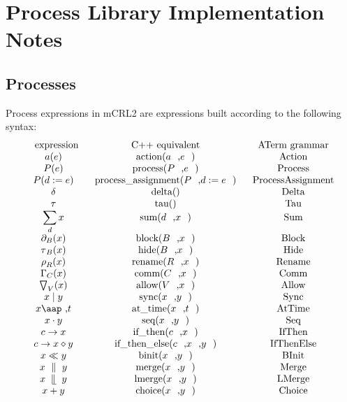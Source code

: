 \documentclass{article}
\begin{document}
\section{Process Library Implementation Notes}

\subsection{Processes}

Process expressions in mCRL2 are expressions built according to the
following syntax:%
\[
\begin{array}{ccc}
\text{expression} & \text{C++ equivalent} & \text{ATerm grammar} \\ 
a(e) & \text{action(}a\text{,}e\text{)} & \text{Action} \\ 
P(e) & \text{process(}P\text{,}e\text{)} & \text{Process} \\ 
P(d:=e) & \text{process\_assignment(}P\text{,}d:=e\text{)} & \text{%
ProcessAssignment} \\ 
\delta & \text{delta()} & \text{Delta} \\ 
\tau & \text{tau()} & \text{Tau} \\ 
\dsum\limits_{d}x & \text{sum(}d\text{,}x\text{)} & \text{Sum} \\ 
\partial _{B}(x) & \text{block(}B\text{,}x\text{)} & \text{Block} \\ 
\tau _{B}(x) & \text{hide(}B\text{,}x\text{)} & \text{Hide} \\ 
\rho _{R}(x) & \text{rename(}R\text{,}x\text{)} & \text{Rename} \\ 
\Gamma _{C}(x) & \text{comm(}C\text{,}x\text{)} & \text{Comm} \\ 
\bigtriangledown _{V}(x) & \text{allow(}V\text{,}x\text{)} & \text{Allow} \\ 
x\mid y & \text{sync(}x\text{,}y\text{)} & \text{Sync} \\ 
x\mbox{\aap ,}t & \text{at\_time(}x\text{,}t\text{)} & \text{AtTime} \\ 
x\cdot y & \text{seq(}x\text{,}y\text{)} & \text{Seq} \\ 
c\rightarrow x & \text{if\_then(}c\text{,}x\text{)} & \text{IfThen} \\ 
c\rightarrow x\diamond y & \text{if\_then\_else(}c\text{,}x\text{,}y\text{)}
& \text{IfThenElse} \\ 
x\ll y & \text{binit(}x\text{,}y\text{)} & \text{BInit} \\ 
x\ \parallel \ y & \text{merge(}x\text{,}y\text{)} & \text{Merge} \\ 
x\ \mathbin{\mathrel{\llfloor}}\ y & \text{lmerge(}x\text{,}y\text{)} & 
\text{LMerge} \\ 
x+y & \text{choice(}x\text{,}y\text{)} & \text{Choice}%
\end{array}%
\]
\end{document}
